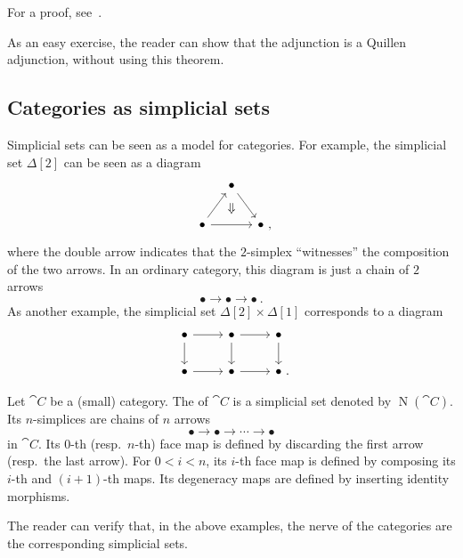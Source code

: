 For a proof, see~\cite[Theorem 3.6.7]{hovey}.

As an easy exercise, the reader can show that the adjunction is a Quillen adjunction,
without using this theorem.

\subsection{Categories as simplicial sets}

Simplicial sets can be seen as a model for categories.
For example, the simplicial set $\Delta[2]$ can be seen as a diagram
\[\begin{tikzcd}[row sep=2em,column sep=1em]
    &\bullet\ar[dr] \\
    \bullet\ar[ur]\ar[rr]\ar[rr,phantom,bend left=45,"\Downarrow"] && \bullet\rlap{\ ,}
\end{tikzcd}\]
where the double arrow indicates that
the $2$-simplex ``witnesses'' the composition of the two arrows.
In an ordinary category, this diagram is just a chain of $2$ arrows
\[\bullet\to\bullet\to\bullet\ .\]
As another example, the simplicial set $\Delta[2]\times\Delta[1]$
corresponds to a diagram
\[\begin{tikzcd}
    \bullet\ar[d]\ar[r] & \bullet\ar[d]\ar[r] & \bullet\ar[d] \\
    \bullet\ar[r] & \bullet\ar[r] & \bullet\rlap{\ .}
\end{tikzcd}\]

\begin{definition}
    Let $\cat C$ be a (small) category.
    The  of $\cat C$ is a simplicial set denoted by $\operatorname{N}(\cat C)$.
    Its $n$-simplices are chains of $n$ arrows
    \[\bullet\to\bullet\to\cdots\to\bullet\]
    in $\cat C$.
    Its $0$-th (resp.\ $n$-th) face map is defined by discarding the first arrow (resp.\ the last arrow).
    For $0<i<n$, its $i$-th face map is defined by composing its $i$-th and $(i+1)$-th maps.
    Its degeneracy maps are defined by inserting identity morphisms.
\end{definition}

The reader can verify that, in the above examples,
the nerve of the categories are the corresponding simplicial sets.

